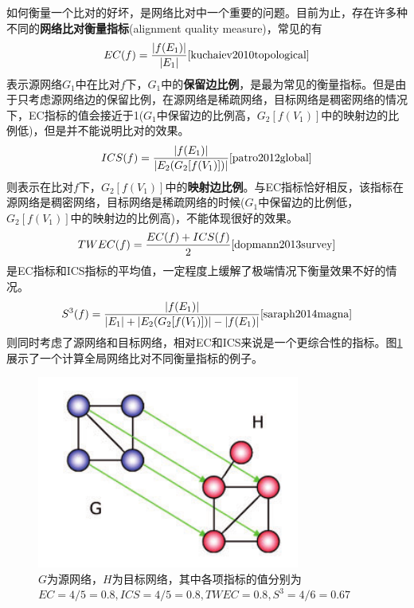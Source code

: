 如何衡量一个比对的好坏，是网络比对中一个重要的问题。目前为止，存在许多种不同的\textbf{网络比对衡量指标}(alignment quality measure)，常见的有
\begin{equation*}
EC(f)=\frac{\left | f(E_1) \right |}{\left | E_1 \right |}\cite{kuchaiev2010topological}
\end{equation*}
表示源网络$G_1$中在比对$f$下，$G_1$中的\textbf{保留边比例}，是最为常见的衡量指标。但是由于只考虑源网络边的保留比例，在源网络是稀疏网络，目标网络是稠密网络的情况下，EC指标的值会接近于1($G_1$中保留边的比例高，$G_2[f(V_1)]$中的映射边的比例低)，但是并不能说明比对的效果。
\begin{equation*}
ICS(f)=\frac{\left | f(E_1) \right |}{\left |E_2(G_2[f(V_1)])\right |}\cite{patro2012global}
\end{equation*}
则表示在比对$f$下，$G_2[f(V_1)]$中的\textbf{映射边比例}。与EC指标恰好相反，该指标在源网络是稠密网络，目标网络是稀疏网络的时候($G_1$中保留边的比例低，$G_2[f(V_1)]$中的映射边的比例高)，不能体现很好的效果。
\begin{equation*}
TWEC(f)=\frac{EC(f)+ICS(f)}{2}\cite{dopmann2013survey}
\end{equation*}
是EC指标和ICS指标的平均值，一定程度上缓解了极端情况下衡量效果不好的情况。
\begin{equation*}
S^{3}(f)=\frac{\left | f(E_1) \right |}{\left | E_1 \right |+\left | E_2(G_2[f(V_1)]) \right |-\left | f(E_1) \right |}\cite{saraph2014magna}
\end{equation*}
则同时考虑了源网络和目标网络，相对EC和ICS来说是一个更综合性的指标。图\ref{fig:measure}展示了一个计算全局网络比对不同衡量指标的例子。

\begin{figure}[htbp]
\centering
\includegraphics[height=0.25\textheight]{pic/measure.png}
\captionsetup{margin=50pt}
\caption{$G$为源网络，$H$为目标网络，其中各项指标的值分别为$EC=4/5=0.8,ICS=4/5=0.8,TWEC=0.8,S^3=4/6=0.67$ \cite{saraph2014magna} \label{fig:measure}}
\end{figure}

